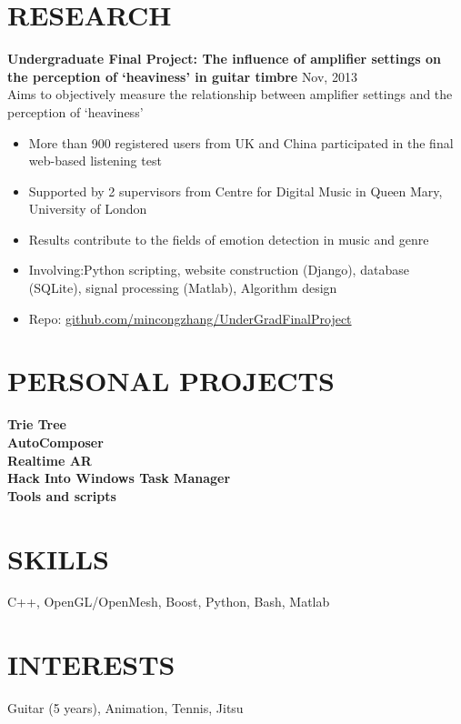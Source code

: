 \documentclass[line,margin]{res}
\begin{document}
\begin{resume}
\section{RESEARCH} 
{\bf Undergraduate Final Project: The influence of amplifier settings on the perception of `heaviness' in guitar timbre}
\hfill{\textcolor[rgb]{0.7,0.7,0.7}{Nov, 2013}}\\
Aims to objectively measure the relationship between amplifier settings and the perception of `heaviness'
\begin{itemize}\itemsep -2pt %
    \item More than 900 registered users from UK and China participated in the final web-based listening test
    \item Supported by 2 supervisors from Centre for Digital Music in Queen Mary, University of London
    \item Results contribute to the fields of emotion detection in music and genre
    \item Involving:Python scripting, website construction (Django), database (SQLite), signal processing (Matlab), Algorithm design
    \item Repo: \href{https://github.com/mincongzhang/UnderGradFinalProject}{github.com/mincongzhang/UnderGradFinalProject}
\end{itemize}


\section{PERSONAL PROJECTS}
{\bf Trie Tree}\\
{\bf AutoComposer}\\
{\bf Realtime AR}\\
{\bf Hack Into Windows Task Manager}\\
{\bf Tools and scripts}\\

\section{SKILLS}
C++, OpenGL/OpenMesh, Boost, Python, Bash, Matlab 

\section{INTERESTS}
Guitar (5 years), Animation, Tennis, Jitsu
\end{resume}
\end{document}
